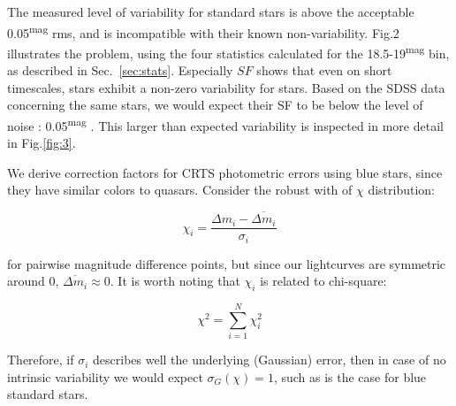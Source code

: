 \documentclass[fleqn,usenatbib]{mnras}  %
\begin{document}
The measured level of variability for standard stars is above the acceptable 0.05\textsuperscript{mag} rms, and is incompatible with their known non-variability. Fig.2 illustrates the problem, using the four statistics calculated for the 18.5-19\textsuperscript{mag} bin, as described in Sec.~\ref{sec:stats}.  Especially $SF$ shows that even on short timescales, stars exhibit a non-zero variability for stars. Based on the SDSS data concerning the same stars, we would expect their SF to be below the level of noise : 0.05\textsuperscript{mag} \citep{ivezic2007}. This larger than expected variability is inspected in more detail in Fig.\ref{fig:3}. 


We derive correction factors for CRTS photometric errors using blue stars, since they  have similar colors to quasars. Consider the robust with of $\chi$ distribution:

\begin{equation}
\chi_{i} = \frac{\Delta m_{i} - \overline{\Delta m_{i}}}{\sigma_{i}}
\end{equation}

for pairwise magnitude difference points, but since our lightcurves are symmetric around 0, $\overline{\Delta m_{i}} \approx 0$.  It is worth noting that $\chi_{i}$ is related to chi-square: 

\begin{equation}
\chi^{2} = \sum_{i=1}^{N}{\chi_{i}^{2}}
\end{equation}

Therefore, if $\sigma_{i}$ describes well the underlying (Gaussian) error, then in case of no intrinsic variability we would expect $\sigma_{G}(\chi) = 1$,  such as is the case for blue standard stars. 
\end{document}
